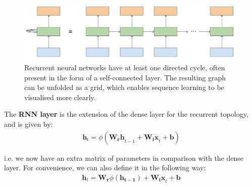 \documentclass[pdftex,12pt,a4paper]{article}
\theoremstyle{definition}
\theoremstyle{remark}
\newcommand*{\V}[1]{\mathbf{#1}}%
\begin{document}
\begin{figure}[t]
    \centering
    \includegraphics[width=\textwidth]{figs/rnn.png}
    \caption{Recurrent neural networks have at least one directed cycle, often present in the form of a self-connected layer. The resulting graph can be unfolded as a grid, which enables sequence learning to be visualised more clearly.}
    \label{fig:rnn}
\end{figure}

\par The \textbf{RNN layer} is the extension of the dense layer for the recurrent topology, and is given by:
\begin{align*}
    \V{h}_t = \phi(\V{W_rh}_{t-1} + \V{W_ix}_t + \V{b})
\end{align*}

\par i.e. we now have an extra matrix of parameters in comparison with the dense layer. For convenience, we can also define it in the following way:
\begin{align*}
    \V{h}_t = \V{W_r}\phi(\V{h_{t-1}}) + \V{W_ix}_t + \V{b}
\end{align*}
\end{document}

